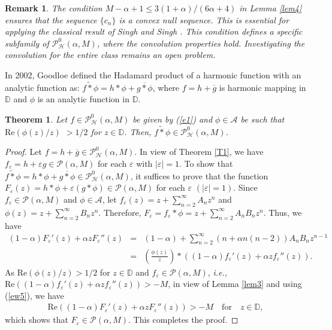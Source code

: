 \documentclass[11pt,reqno]{amsart}
\newtheorem{theo}{Theorem}[section]
\newtheorem{rem}{Remark}[section]
\newtheorem{open problem}{Open problem}[section]
\newcommand{\ol}{\overline}
\newcommand{\beas}{\begin{eqnarray*}}
\newcommand{\eeas}{\end{eqnarray*}}
\newcommand{\bea}{\begin{eqnarray}}
\newcommand{\eea}{\end{eqnarray}}
\renewcommand{\epsilon}{\varepsilon}
\numberwithin{equation}{section}
\begin{document}
 \begin{rem}
The condition $M-\alpha+1\leq 3(1+\alpha)/(6\alpha+4)$ in Lemma \ref{lem4} ensures that the sequence $\{c_n\}$ is a convex null sequence. This is essential for applying the classical result of Singh and Singh \cite{SS1989}. This condition defines a specific subfamily of $\mathcal{P}_{\mathcal{H}}^0(\alpha,M)$, where the convolution properties hold. Investigating the convolution for the entire class remains an open problem.
\end{rem}
In 2002, Goodloe \cite{G2002} defined the Hadamard product of a harmonic function with an analytic function as: $f\tilde{*}\phi=h*\phi+\ol{g*\phi}$,
where $f=h+\ol{g}$ is harmonic mapping in $\mathbb{D}$ and $\phi$ is an analytic function in $\mathbb{D}$.
\begin{theo}\label{Th1}
Let $f\in\mathcal{P}_{\mathcal{H}}^0(\alpha,M)$ be given by (\ref{e1}) and $\phi\in\mathcal{A}$ be such that $\text{Re}\left(\phi(z)/z\right)$ $>1/2$ for $z\in\mathbb{D}$. Then, 
$f\tilde{*}\phi\in\mathcal{P}_{\mathcal{H}}^0(\alpha,M)$.\end{theo}
\begin{proof} Let $f=h+\ol{g}\in\mathcal{P}_{\mathcal{H}}^0(\alpha,M)$. In view of \textrm{Theorem \ref{T1}}, we have $f_\epsilon=h+\epsilon g\in\mathcal{P}(\alpha, M)$ for each 
$\epsilon$ with $|\epsilon|=1$. To show that $f\tilde{*}\phi=h*\phi+\ol{g*\phi}\in\mathcal{P}_{\mathcal{H}}^0(\alpha,M)$, it suffices to prove that the function
$F_\epsilon(z)=h*\phi+\epsilon(g*\phi)\in\mathcal{P}(\alpha, M)$ for each $\epsilon$ $(|\epsilon|=1)$. Since $f_\epsilon\in\mathcal{P}(\alpha, M)$ and $\phi\in\mathcal{A}$, let $f_\epsilon(z)=z+\sum_{n=2}^\infty A_nz^n$ and $\phi(z)=z+\sum_{n=2}^\infty B_nz^n$.
Therefore, $F_\epsilon=f_\epsilon*\phi=z+\sum_{n=2}^\infty A_nB_nz^n$.
Thus, we have
\bea \label{ew5}(1-\alpha)F_\epsilon'(z)+ \alpha zF_\epsilon''(z)&=&(1-\alpha)+\sum_{n=2}^\infty (n+\alpha n(n-2))A_nB_nz^{n-1}\nonumber\\
&=&\left(\frac{\phi(z)}{z}\right)*\left((1-\alpha)f_\epsilon'(z)+ \alpha zf_\epsilon''(z)\right).\eea
As $\text{Re}\left(\phi(z)/z\right)>1/2$ for $z\in\mathbb{D}$ and $f_\epsilon\in\mathcal{P}(\alpha, M)$, {\it i.e.,} $\text{Re}\left((1-\alpha)f_\epsilon'(z)+ \alpha zf_\epsilon''(z)\right)>-M$, in view of \textrm{Lemma \ref{lem3}} and using (\ref{ew5}), we have 
\beas \text{Re}\left((1-\alpha)F_\epsilon'(z)+ \alpha zF_\epsilon''(z)\right)>-M\quad \text{for}\quad  z\in\mathbb{D},\eeas
which shows that $F_\epsilon\in\mathcal{P}(\alpha, M)$. This completes the proof.
\end{proof}
\end{document}
